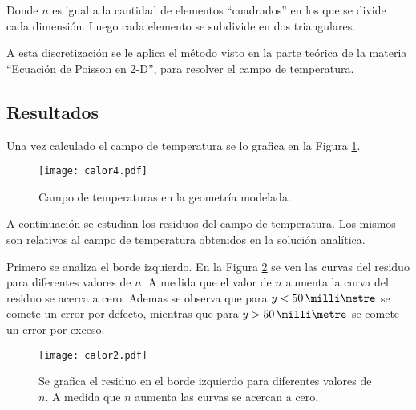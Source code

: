 Donde $n$ es igual a la cantidad de elementos ``cuadrados'' en los que se divide cada dimensi\'on. Luego cada elemento se subdivide en dos triangulares.

A esta discretizaci\'on se le aplica el m\'etodo visto en la parte te\'orica de la materia ``Ecuaci\'on de Poisson en 2-D'', para resolver el campo de temperatura.

\subsection{Resultados}
Una vez calculado el campo de temperatura se lo grafica en la Figura \ref{fig:c4}.
\begin{figure}[h!]
\centering
\texttt{[image: calor4.pdf]}
\caption{Campo de temperaturas en la geometr\'ia modelada.}
\label{fig:c4}
\end{figure}

A continuaci\'on se estudian los residuos del campo de temperatura. Los mismos son relativos al campo de temperatura obtenidos en la soluci\'on anal\'itica.

Primero se analiza el borde izquierdo. En la Figura \ref{fig:c2} se ven las curvas del residuo para diferentes valores de $n$. A medida que el valor de $n$ aumenta la curva del residuo se acerca a cero. Ademas se observa que para $y<50\,\milli\metre$ se comete un error por defecto, mientras que para $y>50\,\milli\metre$ se comete un error por exceso.
\begin{figure}[!ht]
\centering
\texttt{[image: calor2.pdf]}
\caption{Se grafica el residuo en el borde izquierdo para diferentes valores de $n$. A medida que $n$ aumenta las curvas se acercan a cero.}
\label{fig:c2}
\end{figure}

